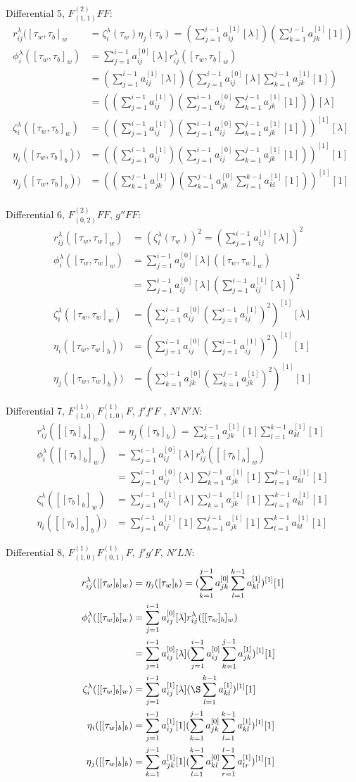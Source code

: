 \documentclass[english,unicode]{article}
\def\SiL{\sum_{j=1}^{i-1}a_{ij}^{[0]}[\lambda]}
\def\SiIL{\sum_{j=1}^{i-1}a_{ij}^{[1]}[\lambda]}
\def\Si{\sum_{j=1}^{i-1}a_{ij}^{[0]}}
\def\Sj{\sum_{k=1}^{j-1}a_{jk}^{[0]}}
\def\Sk{\sum_{l=1}^{k-1}a_{kl}^{[0]}}
\def\SiI{\sum_{j=1}^{i-1}a_{ij}^{[1]}}
\def\SjI{\sum_{k=1}^{j-1}a_{jk}^{[1]}}
\def\SkI{\sum_{l=1}^{k-1}a_{kl}^{[1]}}
\def\SlI{\sum_{r=1}^{l-1}a_{lr}^{[1]}}
\def\SiIO{\sum_{j=1}^{i-1}a_{ij}^{[1]}[1]}
\def\SjIO{\sum_{k=1}^{j-1}a_{jk}^{[1]}[1]}
\def\SkIO{\sum_{l=1}^{k-1}a_{kl}^{[1]}[1]}
\def\EIL{^{[1]}[\lambda]}
\def\EIO{^{[1]}[1]}
\def\L{[\lambda]}
\begin{document}
Differential 5, $F^{(2)}_{(1,1)}FF$:
\begin{align*}
r_{ij}^\lambda([\tau_w,\tau_b]_w & =\zeta_i^\lambda(\tau_w) \eta_j(\tau_b)= ( \SiIL)(\SjIO)\\
\phi_i^\lambda([\tau_w,\tau_b]_w) &= \SiL r_{ij}^\lambda ([\tau_w,\tau_b]_w)\\
& = (\SiIL) (\SiL\SjIO) \\
& = ((\SiI) (\Si\SjIO))\L\\
\zeta_i^\lambda([\tau_w,\tau_b]_w) & =((\SiI) (\Si\SjIO))\EIL\\
\eta_i([\tau_w,\tau_b]_b)) & = ((\SiI) (\Si\SjIO))\EIO\\
\eta_j([\tau_w,\tau_b]_b)) & = ((\SjI) (\Sj\SkIO))\EIO\\
\end{align*}

Differential 6, $F^{(2)}_{(0,2)}FF$, $g''FF$:
\begin{align*}
r_{ij}^\lambda([\tau_w,\tau_w]_w)& =(\zeta_i^\lambda(\tau_w))^2= (\SiIL)^2\\
\phi_i^\lambda([\tau_w,\tau_w]_w) &= \SiL ([\tau_w,\tau_w]_w)\\
& = \SiL(\SiIL)^2\\
\zeta_i^\lambda([\tau_w,\tau_w]_w) &=(\Si(\SiI)^2)\EIL\\
\eta_i([\tau_w,\tau_w]_b)) &=(\Si(\SiI)^2)\EIO\\
\eta_j([\tau_w,\tau_w]_b)) &=(\Sj(\SjI)^2)\EIO
\end{align*}


Differential 7, $F^{(1)}_{(1,0)}F^{(1)}_{(1,0)}F$, $f'f'F$ , $N'N'N$:
\begin{align*}
r_{ij}^\lambda([[\tau_b]_b]_w)& =\eta_j([\tau_b]_b)= \SjIO \SkIO \\
\phi_i^\lambda([[\tau_b]_b]_w) &= \SiL r_{ij}^\lambda ([[\tau_b]_b]_w)\\
& = \SiL \SjIO \SkIO \\
\zeta_i^\lambda([[\tau_b]_b]_w) &=\SiIL \SjIO \SkIO \\
\eta_i([[\tau_b]_b]_b)) &=\SiIO \SjIO \SkIO
\end{align*}

Differential 8, $F^{(1)}_{(1,0)}F^{(1)}_{(0,1)}F$, $f'g'F$, $N'LN$:
\begin{align*}
r_{ij}^\lambda([[\tau_w]_b]_w)& =\eta_j([\tau_w]_b)= (\Sj \SkI)\EIO \\
\phi_i^\lambda([[\tau_w]_b]_w) &= \SiL r_{ij}^\lambda ([[\tau_w]_b]_w)\\
& = \SiL (\Si \SjI)\EIO\\
\zeta_i^\lambda([[\tau_w]_b]_w)& = \SiIL (\S \SkI)\EIO\\
\eta_i([[\tau_w]_b]_b)& = \SiIO (\Sj \SkI)\EIO\\
\eta_j([[\tau_w]_b]_b)& =\SjIO (\Sk \SlI)\EIO
\end{align*}
\end{document}
